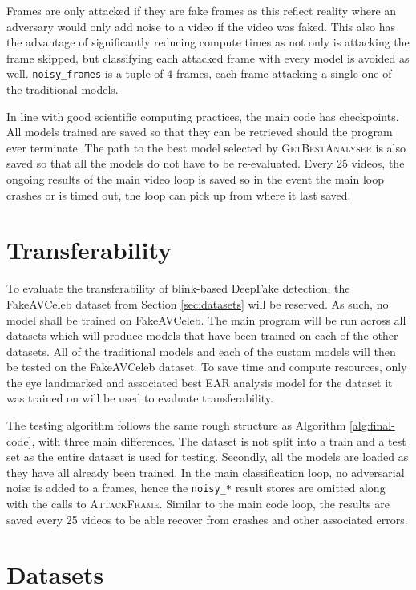 Frames are only attacked if they are fake frames as this reflect reality where an adversary would only add noise to a video if the video was faked. This also has the advantage of significantly reducing compute times as not only is attacking the frame skipped, but classifying each attacked frame with every model is avoided as well. \verb|noisy_frames| is a tuple of 4 frames, each frame attacking a single one of the traditional models. 

In line with good scientific computing practices, the main code has checkpoints. All models trained are saved so that they can be retrieved should the program ever terminate. The path to the best model selected by \textsc{GetBestAnalyser} is also saved so that all the models do not have to be re-evaluated. Every 25 videos, the ongoing results of the main video loop is saved so in the event the main loop crashes or is timed out, the loop can pick up from where it last saved.

\section{Transferability}

To evaluate the transferability of blink-based DeepFake detection, the FakeAVCeleb dataset from Section \ref{sec:datasets} will be reserved. As such, no model shall be trained on FakeAVCeleb. The main program will be run across all datasets which will produce models that have been trained on each of the other datasets. All of the traditional models and each of the custom models will then be tested on the FakeAVCeleb dataset. To save time and compute resources, only the eye landmarked and associated best EAR analysis model for the dataset it was trained on will be used to evaluate transferability.

The testing algorithm follows the same rough structure as Algorithm \ref{alg:final-code}, with three main differences. The dataset is not split into a train and a test set as the entire dataset is used for testing. Secondly, all the models are loaded as they have all already been trained. In the main classification loop, no adversarial noise is added to a frames, hence the \verb|noisy_*| result stores are omitted along with the calls to \textsc{AttackFrame}. Similar to the main code loop, the results are saved every 25 videos to be able recover from crashes and other associated errors. 

\section{Datasets}

